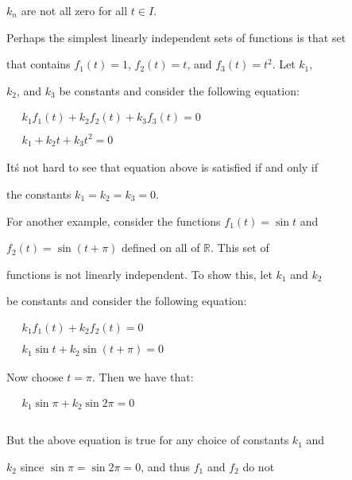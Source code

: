 $k_n$ are not all zero for all $t \in I$.







Perhaps the simplest linearly independent sets of functions is that set

that contains $f_1(t) = 1$, $f_2(t) = t$, and $f_3(t) = t^2$. Let $k_1$,

$k_2$, and $k_3$ be constants and consider the following equation:



$\begin{aligned} \quad k_1f_1(t) + k_2f_2(t) + k_3f_3(t) = 0 \\\\ \quad k_1 + k_2t + k_3t^2 = 0 \end{aligned}$



It\'s not hard to see that equation above is satisfied if and only if

the constants $k_1 = k_2 = k_3 = 0$.



For another example, consider the functions $f_1(t) = \sin t$ and

$f_2(t) = \sin (t + \pi)$ defined on all of $\mathbb{R}$. This set of

functions is not linearly independent. To show this, let $k_1$ and $k_2$

be constants and consider the following equation:



$\begin{aligned} \quad k_1f_1(t) + k_2f_2(t) = 0 \\\\ \quad k_1 \sin t + k_2 \sin (t + \pi) = 0 \end{aligned}$



Now choose $t = \pi$. Then we have that:



$\begin{aligned} \quad k_1 \sin \pi + k_2 \sin 2\pi = 0 \\\\ \end{aligned}$



But the above equation is true for any choice of constants $k_1$ and

$k_2$ since $\sin \pi = \sin 2\pi = 0$, and thus $f_1$ and $f_2$ do not

